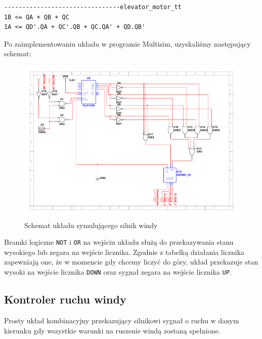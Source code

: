 \documentclass[a4paper]{article}
\begin{document}
\begin{verbatim}
--------------------------------elevator_motor_tt
1B <= QA + QB + QC
1A <= QD'.QA + QC'.QB + QC.QA' + QD.QB'
\end{verbatim}

Po zaimplementowaniu układu w programie Multisim, uzyskaliśmy następujący schemat:
\begin{figure}[H]
    \centering
    \includegraphics[width=\textwidth]{elevator_motor_simulator_schemat.pdf}
    \caption{Schemat układu symulującego silnik windy}
\end{figure}

Bramki logiczne \verb|NOT| i \verb|OR| na wejściu układu służą do przekazywania stanu wysokiego 
lub zegara na wejście licznika. Zgodnie z tabelką działania licznika zapewniają one, że 
w momencie gdy chcemy liczyć do góry, układ przekazuje stan wysoki na wejście licznika \verb|DOWN|
oraz sygnał zegara na wejście licznika \verb|UP|.

\pagebreak

\subsection{Kontroler ruchu windy}

Prosty układ kombinacyjny przekazujący silnikowi sygnał o ruchu w danym kierunku gdy wszystkie warunki
na ruszenie windą zostaną spełnione.
\end{document}
